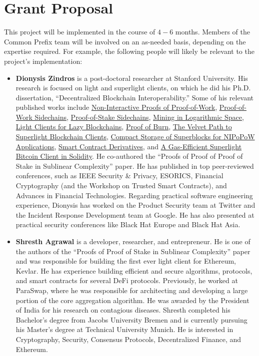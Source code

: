 \section{Grant Proposal}

This project will be implemented in the course of $4-6$ months. Members of the
Common Prefix team will be involved on an as-needed basis, depending on the
expertise required. For example, the following people will likely be relevant
to the project's implementation:

\begin{itemize}
    \item \textbf{Dionysis Zindros} is a post-doctoral researcher at Stanford University. His research is focused on light and superlight clients, on which he did his Ph.D. dissertation, “Decentralized Blockchain Interoperability.” Some of his relevant published works include \href{https://eprint.iacr.org/2017/963.pdf}{Non-Interactive Proofs of Proof-of-Work}, \href{https://eprint.iacr.org/2018/1048.pdf}{Proof-of-Work Sidechains}, \href{https://eprint.iacr.org/2018/1048.pdf}{Proof-of-Stake
      Sidechains}, \href{https://eprint.iacr.org/2021/623.pdf}{Mining in Logarithmic Space}, \href{https://arxiv.org/abs/2203.15968}{Light Clients for Lazy Blockchains}, \href{https://eprint.iacr.org/2019/1096.pdf}{Proof of Burn}, \href{https://eprint.iacr.org/2020/1122.pdf}{The Velvet Path to Superlight Blockchain Clients}, \href{https://eprint.iacr.org/2019/1444.pdf}{Compact Storage of Superblocks for NIPoPoW Applications}, \href{https://eprint.iacr.org/2020/138.pdf}{Smart Contract Derivatives}, and
      \href{https://eprint.iacr.org/2020/927}{A Gas-Efficient Superlight Bitcoin Client in Solidity}. He co-authored the “Proofs of Proof of Proof of Stake in Sublinear Complexity” paper. He has published in top peer-reviewed conferences, such as IEEE Security \& Privacy, ESORICS, Financial Cryptography (and the Workshop on Trusted Smart Contracts), and Advances in Financial Technologies. Regarding practical software engineering experience, Dionysis has worked on the Product Security team at Twitter and the Incident Response Development team at Google. He has also presented at practical security conferences like Black Hat Europe and Black Hat Asia. 
  \item \textbf{Shresth Agrawal} is a developer, researcher, and entrepreneur. He is one of the authors of the “Proofs of Proof of Stake in Sublinear Complexity” paper and was responsible for building the first ever light client for Ethereum, Kevlar. He has experience building efficient and secure algorithms, protocols, and smart contracts for several DeFi protocols. Previously, he worked at ParaSwap, where he was responsible for architecting and developing a large portion of the core aggregation algorithm. He was awarded by the President of India for his research on contagious diseases. Shresth completed his Bachelor’s degree from Jacobs University Bremen and is currently pursuing his Master’s degree at Technical University Munich. He is interested in Cryptography, Security, Consensus Protocols, Decentralized Finance, and Ethereum.

\end{itemize}
